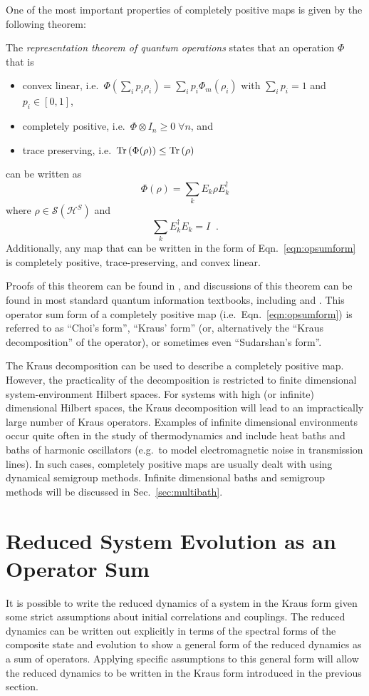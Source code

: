 One of the most important properties of completely positive maps is given by the following theorem: 
\begin{theorem}
The {\em representation theorem of quantum operations} states that an operation $\Phi$ that is
\begin{itemize}
\item convex linear, i.e.\ $\Phi\left(\sum_i p_i\rho_i\right)=\sum_ip_i\Phi_m(\rho_i)$ with $\sum_i p_i = 1$ and $p_i\in[0,1]$, 
\item completely positive, i.e.\ $\Phi \otimes I_n \ge 0 \;\forall n$, and
\item trace preserving, i.e.\ $\operatorname{Tr}\left(\Phi(\rho)\right)\le\operatorname{Tr}\left(\rho\right)$
\end{itemize}
can be written as
\begin{equation}
\label{eqn:opsumform}
\Phi(\rho)  = \sum_k E_{k}\rho E_{k}^\dagger
\end{equation}
where $\rho\in\mathcal{S}(\mathcal{H}^S)$ and 
$$
\sum_k E_{k}^\dagger E_{k}= I\;\;.
$$
Additionally, any map that can be written in the form of Eqn.\ \ref{eqn:opsumform} is completely positive, trace-preserving, and convex linear.
\end{theorem}

Proofs of this theorem can be found in \cite{Breuer2007,Kraus1983}, and discussions of this theorem can be found in most standard quantum information textbooks, including \cite{Nielsen2010} and \cite{Preskill2004}.  This operator sum form of a completely positive map (i.e.\ Eqn.\ \ref{eqn:opsumform}) is referred to as ``Choi's form'', ``Kraus' form'' (or, alternatively the ``Kraus decomposition'' of the operator), or sometimes even ``Sudarshan's form''.   

The Kraus decomposition can be used to describe a completely positive map.  However, the practicality of the decomposition is restricted to finite dimensional system-environment Hilbert spaces.  For systems with high (or infinite) dimensional Hilbert spaces, the Kraus decomposition will lead to an impractically large number of Kraus operators.  Examples of infinite dimensional environments occur quite often in the study of thermodynamics and include heat baths and baths of harmonic oscillators (e.g.\ to model electromagnetic noise in transmission lines).  In such cases, completely positive maps are usually dealt with using dynamical semigroup methods.  Infinite dimensional baths and semigroup methods will be discussed in Sec.\ \ref{sec:multibath}.

\section{Reduced System Evolution as an Operator Sum}
\label{sec:redsysopform}
It is possible to write the reduced dynamics of a system in the Kraus form given some strict assumptions about initial correlations and couplings.  The reduced dynamics can be written out explicitly in terms of the spectral forms of the composite state and evolution to show a general form of the reduced dynamics as a sum of operators.  Applying specific assumptions to this general form will allow the reduced dynamics to be written in the Kraus form introduced in the previous section.

